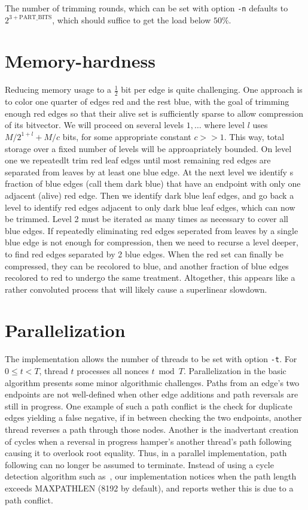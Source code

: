 \documentclass[11pt, oneside]{article}
\begin{document}
The number of trimming rounds, which can be set with option {\tt -n} defaults to
$2^{3+\mbox{PART\_BITS}}$, which should suffice to get the load below $50\%$.

\section{Memory-hardness}
Reducing memory usage to a $\frac{1}{2}$ bit per edge is quite challenging.
One approach is to color one quarter of edges red and the rest blue,
with the goal of trimming enough red edges so that
their alive set is sufficiently sparse to allow compression of its bitvector.
We will proceed on several levels $1,\ldots$ where level $l$ uses $M/2^{1+l}+M/c$ bits,
for some appropriate constant $c>>1$. This way, total storage over a fixed number of levels
will be approapriately bounded.
On level one we repeatedlt trim red leaf edges until most remaining red edges
are separated from leaves by at least one blue edge. At the next level we identify
s fraction of blue edges (call them dark blue) that have an endpoint with
only one adjacent (alive) red edge.
Then we identify dark blue leaf edges, and go back a level to identify red edges adjacent
to only dark blue leaf edges, which can now be trimmed. Level 2 must be iterated as
many times as necessary to cover all blue edges.
If repeatedly eliminating red edges seperated from leaves by a single blue edge is not
enough for compression, then we need to recurse a level deeper, to find red edges separated
by 2 blue edges.
When the red set can finally be compressed, they can be recolored to blue, and another
fraction of blue edges recolored to red to undergo the same treatment.
Altogether, this appears like a rather convoluted process that will likely
cause a superlinear slowdown.

\section{Parallelization}
The implementation allows the number of threads to be set with option {\tt -t}.
For $0\leq t < T$, thread $t$ processes all nonces $t \bmod T$.
Parallelization in the basic algorithm presents some minor algorithmic challenges.
Paths from an edge's two endpoints
are not well-defined when other edge additions and path reversals are still in progress.
One example of such a path conflict is the check for duplicate edges yielding a false negative,
if in between checking the two endpoints, another thread reverses a path through those nodes.
Another is the inadvertant creation of cycles when a reversal in progress hamper's another thread's
path following causing it to overlook root equality.
Thus, in a parallel implementation, path following can no longer be assumed to terminate.
Instead of using a cycle detection algorithm such as~\cite{1980-brent-cycles}, our implementation
notices when the path length exceeds MAXPATHLEN (8192 by default),
and reports wether this is due to a path conflict.
\end{document}

